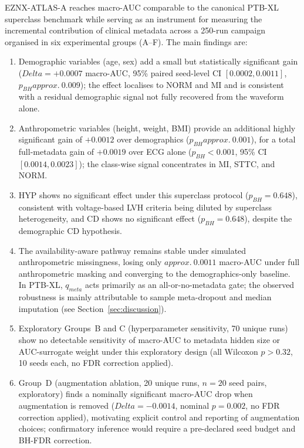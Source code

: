 \documentclass[mathematics,article,pdftex]{Definitions/mdpi}
\def\mathrm#1{#1}%
\def\textbf#1{#1}%
\def\Delta{Delta }%
\def\approx{approx.\ }%
\begin{document}
EZNX-ATLAS-A reaches macro-AUC comparable to the canonical PTB-XL superclass benchmark while serving as an instrument for measuring the incremental contribution of clinical metadata across a \textbf{250-run campaign organised in six experimental groups (A--F)}. The main findings are:

\begin{enumerate}[label=(\alph*)]
\item \textbf{Demographic variables} (age, sex) \textbf{add a small but statistically significant gain} ($\Delta{=}+0.0007$ macro-AUC, 95\% paired seed-level CI $[0.0002, 0.0011]$, $p_{\mathrm{BH}}{\approx}0.009$); the effect localises to NORM and MI and is consistent with a residual demographic signal not fully recovered from the waveform alone.
\item \textbf{Anthropometric variables} (height, weight, BMI) \textbf{provide an additional highly significant gain} of $+0.0012$ over demographics ($p_{\mathrm{BH}}{\approx}0.001$), for a total full-metadata gain of $+0.0019$ over ECG alone ($p_{\mathrm{BH}}{<}0.001$, 95\% CI $[0.0014, 0.0023]$); the class-wise signal concentrates in MI, STTC, and NORM.
\item \textbf{HYP shows no significant effect} under this superclass protocol ($p_{\mathrm{BH}}{=}0.648$), consistent with voltage-based LVH criteria being diluted by superclass heterogeneity, and \textbf{CD shows no significant effect} ($p_{\mathrm{BH}}{=}0.648$), despite the demographic CD hypothesis.
\item The \textbf{availability-aware pathway} remains stable under simulated anthropometric missingness, losing only $\approx 0.0011$ macro-AUC under full anthropometric masking and converging to the demographics-only baseline. In PTB-XL, $q_{\mathrm{meta}}$ acts primarily as an all-or-no-metadata gate; the observed robustness is mainly attributable to sample meta-dropout and median imputation (see Section~\ref{sec:discussion}).
\item \textbf{Exploratory Groups~B and C} (hyperparameter sensitivity, 70 unique runs) show no detectable sensitivity of macro-AUC to metadata hidden size or AUC-surrogate weight under this exploratory design (all Wilcoxon $p{>}0.32$, 10 seeds each, no FDR correction applied).
\item \textbf{Group~D} (augmentation ablation, 20 unique runs, $n{=}20$ seed pairs, exploratory) finds a nominally significant macro-AUC drop when augmentation is removed ($\Delta{=}{-}0.0014$, nominal $p{=}0.002$, no FDR correction applied), motivating explicit control and reporting of augmentation choices; confirmatory inference would require a pre-declared seed budget and BH-FDR correction.

\end{enumerate}
\end{document}
